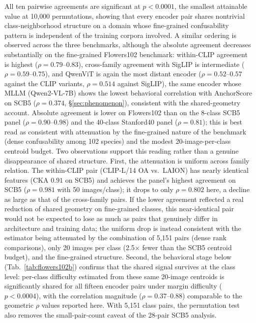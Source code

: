 \documentclass[a4paper,fleqn]{cas-sc}
\begin{document}
All ten pairwise agreements are significant at $p<0.0001$, the smallest attainable value at 10{,}000 permutations, showing that every encoder pair shares nontrivial class-neighborhood structure on a domain whose fine-grained confusability pattern is independent of the training corpora involved. A similar ordering is observed across the three benchmarks, although the absolute agreement decreases substantially on the fine-grained Flowers102 benchmark: within-CLIP agreement is highest ($\rho=0.79$--$0.83$), cross-family agreement with SigLIP is intermediate ($\rho=0.59$--$0.75$), and QwenViT is again the most distant encoder ($\rho=0.52$--$0.57$ against the CLIP variants, $\rho=0.514$ against SigLIP), the same encoder whose MLLM (Qwen2-VL-7B) shows the lowest behavioral correlation with AnchorScore on SCB5 ($\rho=0.374$, \S\ref{sec:phenomenon}), consistent with the shared-geometry account. Absolute agreement is lower on Flowers102 than on the 8-class SCB5 panel ($\rho=0.90$--$0.98$) and the 40-class Stanford40 panel ($\rho=0.81$); this is best read as consistent with attenuation by the fine-grained nature of the benchmark (dense confusability among 102 species) and the modest 20-image-per-class centroid budget. Two observations support this reading rather than a genuine disappearance of shared structure. First, the attenuation is uniform across family relation. The within-CLIP pair (CLIP-L/14 OA vs.\ LAION) has nearly identical features (CKA $0.91$ on SCB5) and achieves the panel's highest agreement on SCB5 ($\rho=0.981$ with 50 images/class); it drops to only $\rho=0.802$ here, a decline as large as that of the cross-family pairs. If the lower agreement reflected a real reduction of shared geometry on fine-grained classes, this near-identical pair would not be expected to lose as much as pairs that genuinely differ in architecture and training data; the uniform drop is instead consistent with the estimator being attenuated by the combination of 5{,}151 pairs (dense rank comparisons), only 20 images per class (2.5$\times$ fewer than the SCB5 centroid budget), and the fine-grained structure. Second, the behavioral stage below (Tab.~\ref{tab:flowers102b}) confirms that the shared signal survives at the class level: per-class difficulty estimated from these same 20-image centroids is significantly shared for all fifteen encoder pairs under margin difficulty ($p<0.0004$), with the correlation magnitude ($\rho=0.37$--$0.88$) comparable to the geometric $\rho$ values reported here. With 5{,}151 class pairs, the permutation test also removes the small-pair-count caveat of the 28-pair SCB5 analysis.
\end{document}
